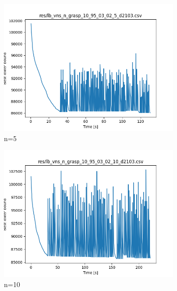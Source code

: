 \begin{figure}[!h]
	\begin{subfigure}{.5\columnwidth}
		\centering
		\includegraphics[width=\columnwidth]{../res/lb_vns_n_grasp_10_95_03_02_5_d2103.png}
		\caption{n=5}
		\label{fig:lb_vns_n_grasp_10_95_03_02_5_d2103}
	\end{subfigure}
	\begin{subfigure}{.5\columnwidth}
		\centering
		\includegraphics[width=\columnwidth]{../res/lb_vns_n_grasp_10_95_03_02_10_d2103.png}
		\caption{n=10}
		\label{fig:lb_vns_n_grasp_10_95_03_02_10_d2103}
	\end{subfigure}
	\begin{subfigure}{.5\columnwidth}
		\centering

\end{subfigure}
\end{figure}
